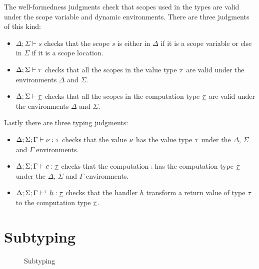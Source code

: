 {The well-formedness judgments check that scopes used in the types are valid under the scope variable and dynamic environments.
There are three judgments of this kind:
\begin{itemize}
\setlength\itemsep{0.5em}
\item $\Delta;\Sigma \vdash s$ checks that the scope $s$ is either in $\Delta$ if it is a scope variable or else in $\Sigma$ if it is a scope location.
\item $\Delta;\Sigma \vdash \tau$ checks that all the scopes in the value type $\tau$ are valid under the environments $\Delta$ and $\Sigma$.
\item $\Delta;\Sigma \vdash \underline{\tau}$ checks that all the scopes in the computation type $\underline{\tau}$ are valid under the environments $\Delta$ and $\Sigma$.
\end{itemize}

Lastly there are three typing judgments:
\begin{itemize}
\setlength\itemsep{0.5em}
\item $\Delta;\Sigma;\Gamma \vdash \nu : \tau$ checks that the value $\nu$ has the value type $\tau$ under the $\Delta$, $\Sigma$ and $\Gamma$ environments.
\item $\Delta;\Sigma;\Gamma \vdash c : \underline{\tau}$ checks that the computation $\comp$ has the computation type $\underline{\tau}$ under the $\Delta$, $\Sigma$ and $\Gamma$ environments.
\item $\Delta;\Sigma;\Gamma \vdash^{\tau} h : \underline{\tau}$ checks that the handler $h$ transform a return value of type $\tau$ to the computation type $\underline{\tau}$.
\end{itemize}

\section{Subtyping}
\label{sec:subtyping}
\begin{figure}
\caption{Subtyping}
\centering
{}
\end{figure}

}
